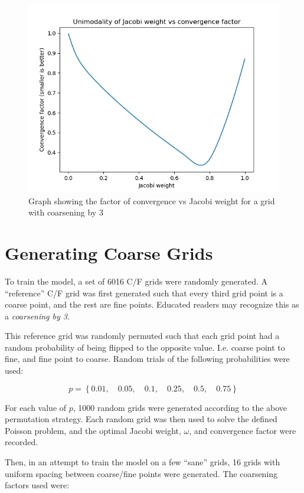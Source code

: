 \begin{figure}[h]
  \centering
  \includegraphics[scale=0.7]{figures/jacobi-conv-unimodality.png}
  \caption{Graph showing the factor of convergence vs Jacobi weight for a grid with coarsening by 3}
  \label{fig:jacobi_unimodal}
\end{figure}

\section{Generating Coarse Grids}

To train the model, a set of 6016 C/F grids were randomly generated.  A ``reference'' C/F grid was first generated such that every third grid point is a coarse point, and the rest are fine points.  Educated readers may recognize this as a \textit{coarsening by 3}.

This reference grid was randomly permuted such that each grid point had a random probability of being flipped to the opposite value.  I.e. coarse point to fine, and fine point to coarse.  Random trials of the following probabilities were used:

$$ p = \left\{0.01, \quad 0.05, \quad 0.1, \quad 0.25, \quad 0.5, \quad 0.75\right\} $$

For each value of $p$, 1000 random grids were generated according to the above permutation strategy.  Each random grid was then used to solve the defined Poisson problem, and the optimal Jacobi weight, $\omega$, and convergence factor were recorded.

Then, in an attempt to train the model on a few ``sane'' grids, 16 grids with uniform spacing between coarse/fine points were generated.  The coarsening factors used were:

